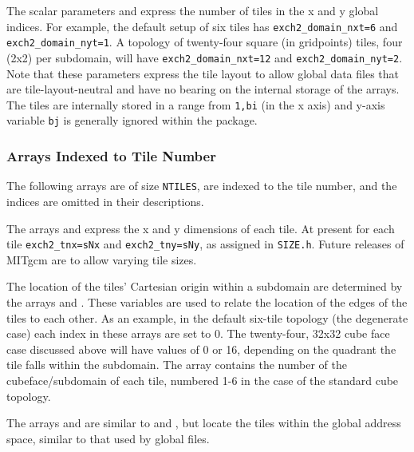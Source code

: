 The scalar parameters 
and  express the number
of tiles in the x and y global indices.  For example, the default
setup of six tiles has \texttt{exch2\_domain\_nxt=6} and
\texttt{exch2\_domain\_nyt=1}.  A topology of twenty-four square (in
gridpoints) tiles, four (2x2) per subdomain, will have
\texttt{exch2\_domain\_nxt=12} and \texttt{exch2\_domain\_nyt=2}.
Note that these parameters express the tile layout to allow global
data files that are tile-layout-neutral and have no bearing on the
internal storage of the arrays.  The tiles are internally stored in a
range from \texttt{1,bi} (in the x axis) and y-axis variable
\texttt{bj} is generally ignored within the package.

\subsubsection{Arrays Indexed to Tile Number}

The following arrays are of size \texttt{NTILES}, are indexed to the
tile number, and the indices are omitted in their descriptions.

The arrays  and
 express the x and y dimensions of each
tile.  At present for each tile \texttt{exch2\_tnx=sNx} and
\texttt{exch2\_tny=sNy}, as assigned in \texttt{SIZE.h}.  Future
releases of MITgcm are to allow varying tile sizes.

The location of the tiles' Cartesian origin within a subdomain are
determined by the arrays  and
.  These variables are used to
relate the location of the edges of the tiles to each other.  As an
example, in the default six-tile topology (the degenerate case) each
index in these arrays are set to 0.  The twenty-four, 32x32 cube face
case discussed above will have values of 0 or 16, depending on the
quadrant the tile falls within the subdomain.  The array 
 contains the number of the
cubeface/subdomain of each tile, numbered 1-6 in the case of the
standard cube topology.

The arrays  and
 are similar to
 and
, but locate the tiles within the
global address space, similar to that used by global files.

